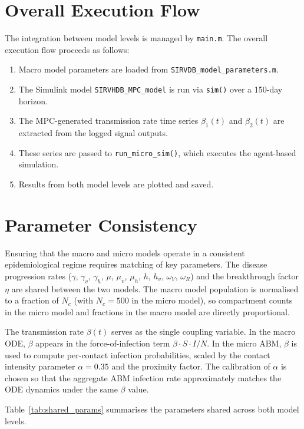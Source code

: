 \section{Overall Execution Flow}
\label{sec:exec_flow}

The integration between model levels is managed by \texttt{main.m}.
The overall execution flow proceeds as follows:
\begin{enumerate}
  \item Macro model parameters are loaded from \texttt{SIRVDB\_model\_parameters.m}.
  \item The Simulink model \texttt{SIRVHDB\_MPC\_model} is run via \texttt{sim()} over a 150-day horizon.
  \item The MPC-generated transmission rate time series $\beta_1(t)$ and $\beta_2(t)$ are extracted from the logged signal outputs.
  \item These series are passed to \texttt{run\_micro\_sim()}, which executes the agent-based simulation.
  \item Results from both model levels are plotted and saved.
\end{enumerate}

\section{Parameter Consistency}
\label{sec:param_consistency}

Ensuring that the macro and micro models operate in a consistent epidemiological regime requires matching of key parameters.
The disease progression rates ($\gamma$, $\gamma_v$, $\gamma_h$, $\mu$, $\mu_v$, $\mu_h$, $h$, $h_v$, $\omega_V$, $\omega_R$) and the breakthrough factor $\eta$ are shared between the two models.
The macro model population is normalised to a fraction of $N_c$ (with $N_c = 500$ in the micro model), so compartment counts in the micro model and fractions in the macro model are directly proportional.

The transmission rate $\beta(t)$ serves as the single coupling variable.
In the macro ODE, $\beta$ appears in the force-of-infection term $\beta \cdot S \cdot I / N$.
In the micro ABM, $\beta$ is used to compute per-contact infection probabilities, scaled by the contact intensity parameter $\alpha = 0.35$ and the proximity factor.
The calibration of $\alpha$ is chosen so that the aggregate ABM infection rate approximately matches the ODE dynamics under the same $\beta$ value.

Table~\ref{tab:shared_params} summarises the parameters shared across both model levels.

